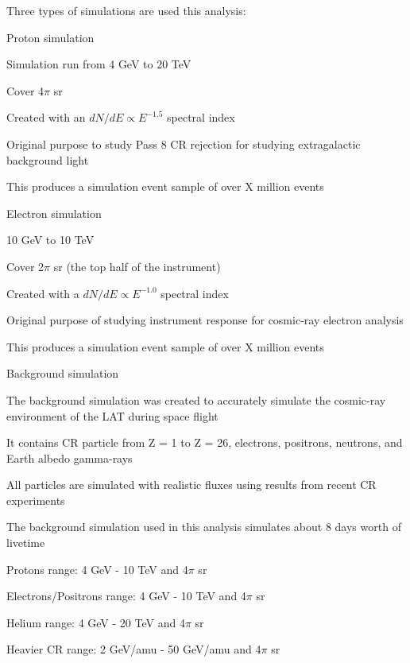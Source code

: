 \documentclass{article}
\begin{document}
\begin{myEnumerate}
\begin{myEnumerate}
				\item Three types of simulations are used this analysis:
				\item Proton simulation
				\begin{myEnumerate}
					\item Simulation run from 4 GeV to 20 TeV
					\item Cover 4$\pi$ sr 
					\item Created with an $dN/dE \propto E^{-1.5}$ spectral index
					\item Original purpose to study Pass 8 CR rejection for studying extragalactic background light 
					\item This produces a simulation event sample of over X million events
				\end{myEnumerate}
				\item Electron simulation
				\begin{myEnumerate}
					\item  10 GeV to 10 TeV
					\item Cover 2$\pi$ sr (the top half of the instrument)
					\item Created with a $dN/dE \propto E^{-1.0}$ spectral index
					\item Original purpose of studying instrument response for cosmic-ray electron analysis
					\item This produces a simulation event sample of over X million events
				\end{myEnumerate}
				\item Background simulation 
				\begin{myEnumerate}
					\item The background simulation was created to accurately simulate the cosmic-ray environment of the LAT during space flight
					\item It contains CR particle from Z = 1 to Z = 26, electrons, positrons, neutrons, and Earth albedo gamma-rays
					\item All particles are simulated with realistic fluxes using results from recent CR experiments
					\item The background simulation used in this analysis simulates about 8 days worth of livetime 
					\item Protons range: 4 GeV - 10 TeV and 4$\pi$ sr
					\item Electrons/Positrons range: 4 GeV - 10 TeV and 4$\pi$ sr
					\item Helium range: 4 GeV - 20 TeV and 4$\pi$ sr
					\item Heavier CR range: 2 GeV/amu - 50 GeV/amu and 4$\pi$ sr

\end{myEnumerate}
\end{myEnumerate}
\end{myEnumerate}
\end{document}
